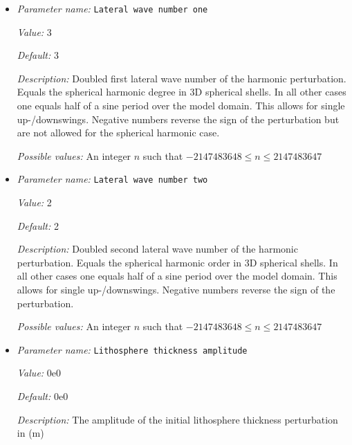 \begin{itemize}
\item {\it Parameter name:} {\tt Lateral wave number one}
\label{parameters:Initial temperature model/Solidus/Perturbation/Lateral wave number one}


{\it Value:} 3


{\it Default:} 3


{\it Description:} Doubled first lateral wave number of the harmonic perturbation. Equals the spherical harmonic degree in 3D spherical shells. In all other cases one equals half of a sine period over the model domain. This allows for single up-/downswings. Negative numbers reverse the sign of the perturbation but are not allowed for the spherical harmonic case.


{\it Possible values:} An integer $n$ such that $-2147483648\leq n \leq 2147483647$
\item {\it Parameter name:} {\tt Lateral wave number two}
\label{parameters:Initial temperature model/Solidus/Perturbation/Lateral wave number two}


{\it Value:} 2


{\it Default:} 2


{\it Description:} Doubled second lateral wave number of the harmonic perturbation. Equals the spherical harmonic order in 3D spherical shells. In all other cases one equals half of a sine period over the model domain. This allows for single up-/downswings. Negative numbers reverse the sign of the perturbation.


{\it Possible values:} An integer $n$ such that $-2147483648\leq n \leq 2147483647$
\item {\it Parameter name:} {\tt Lithosphere thickness amplitude}
\label{parameters:Initial temperature model/Solidus/Perturbation/Lithosphere thickness amplitude}


{\it Value:} 0e0


{\it Default:} 0e0


{\it Description:} The amplitude of the initial lithosphere thickness perturbation in (m)



\end{itemize}
